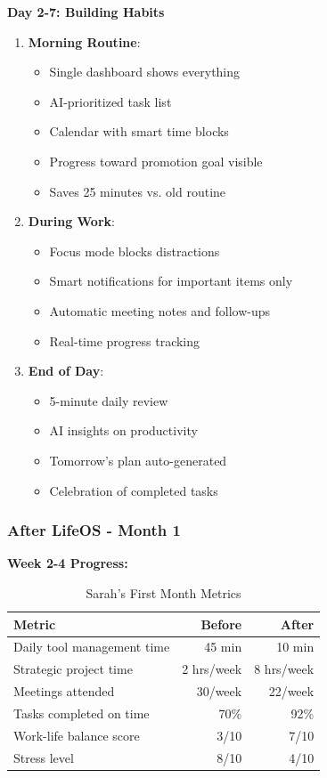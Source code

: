 \textbf{Day 2-7: Building Habits}
\begin{enumerate}
    \item \textbf{Morning Routine}:
    \begin{itemize}
        \item Single dashboard shows everything
        \item AI-prioritized task list
        \item Calendar with smart time blocks
        \item Progress toward promotion goal visible
        \item Saves 25 minutes vs. old routine
    \end{itemize}
    
    \item \textbf{During Work}:
    \begin{itemize}
        \item Focus mode blocks distractions
        \item Smart notifications for important items only
        \item Automatic meeting notes and follow-ups
        \item Real-time progress tracking
    \end{itemize}
    
    \item \textbf{End of Day}:
    \begin{itemize}
        \item 5-minute daily review
        \item AI insights on productivity
        \item Tomorrow's plan auto-generated
        \item Celebration of completed tasks
    \end{itemize}
\end{enumerate}

\subsubsection{After LifeOS - Month 1}

\textbf{Week 2-4 Progress:}

\begin{table}[H]
\centering
\caption{Sarah's First Month Metrics}
\begin{tabular}{|l|r|r|}
\hline
\rowcolor{lightgray}
\textbf{Metric} & \textbf{Before} & \textbf{After} \\
\hline
Daily tool management time & 45 min & 10 min \\
\hline
Strategic project time & 2 hrs/week & 8 hrs/week \\
\hline
Meetings attended & 30/week & 22/week \\
\hline
Tasks completed on time & 70\% & 92\% \\
\hline
Work-life balance score & 3/10 & 7/10 \\
\hline
Stress level & 8/10 & 4/10 \\
\hline
\end{tabular}
\end{table}

